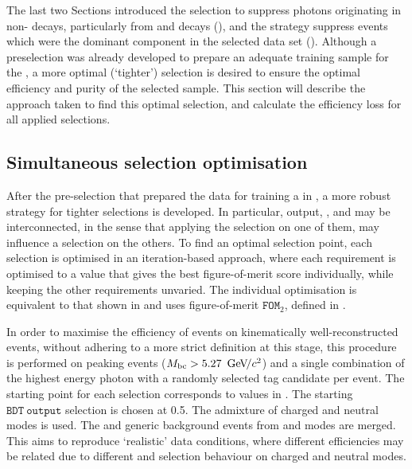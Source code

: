 \sloppy The last two Sections introduced the selection to suppress photons originating in non-\mbox{\BtoXsgamma} decays, particularly from \piz and \eta decays (),
and the strategy suppress \mbox{\epem\ra\qqbar} events which were the dominant component in the selected data set ().
Although a preselection was already developed to prepare an adequate training sample for the \BDT, a more optimal (`tighter') selection is desired to ensure the optimal efficiency and purity of the selected sample.
This section will describe the approach taken to find this optimal selection, and calculate the efficiency loss for all applied selections.

\subsection{Simultaneous selection optimisation}\label{sec:simultaneous_optimisation}

After the pre-selection that prepared the data for training a \BDT in , a more robust strategy for tighter selections is developed.
In particular, \BDT output, \piVeto, \etaVeto and \ZMVA may be interconnected, in the sense that applying the selection on one of them, may influence a selection on the others. 
To find an optimal selection point, each selection is optimised in an iteration-based approach, 
where each requirement is optimised to a value that gives the best figure-of-merit score individually,
while keeping the other requirements unvaried.
The individual optimisation is equivalent to that shown in  and uses figure-of-merit $\mathtt{FOM}_2$, defined in .


In order to maximise the efficiency of events on kinematically well-reconstructed events, without adhering to a more strict definition at this stage, 
this procedure is performed on peaking events (${M_{\mathrm{bc}}} >5.27~{\mathrm{\,Ge\kern -0.1em V\!/}c^2}$) and a single combination of the highest energy photon with a randomly selected tag candidate per event.
The starting point for each selection corresponds to values in .
The starting $\mathtt{BDT~output}$ selection is chosen at 0.5. 
The \BtoXsgamma admixture of charged and neutral modes is used.
The \epem\ra\qqbar and generic \BB background events from \feiBp and \feiBz modes are merged.
This aims to reproduce `realistic' data conditions, where different efficiencies may be related due to different \FEI and selection behaviour on charged and neutral modes.

